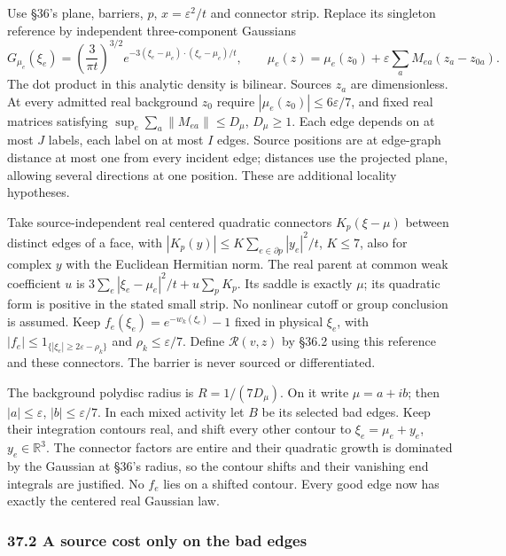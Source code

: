 \documentclass[11pt,a4paper]{article}
\begin{document}
Use §36's plane, barriers, \(p\), \(x=\varepsilon^2/t\) and connector
strip. Replace its singleton reference by independent three-component
Gaussians \[G_{\mu_e}(\xi_e)=\left(\frac3{\pi t}\right)^{3/2}
 e^{-3(\xi_e-\mu_e)\cdot(\xi_e-\mu_e)/t},\qquad
\mu_e(z)=\mu_e(z_0)+\varepsilon\sum_a M_{ea}(z_a-z_{0a}).
\tag{173}\] The dot product in this analytic density is bilinear.
Sources \(z_a\) are dimensionless. At every admitted real background
\(z_0\) require \(|\mu_e(z_0)|\le6\varepsilon/7\), and fixed real
matrices satisfying \(\sup_e\sum_a\|M_{ea}\|\le D_\mu\), \(D_\mu\ge1\).
Each edge depends on at most \(J\) labels, each label on at most \(I\)
edges. Source positions are at edge-graph distance at most one from
every incident edge; distances use the projected plane, allowing several
directions at one position. These are additional locality hypotheses.

Take source-independent real centered quadratic connectors
\(K_p(\xi-\mu)\) between distinct edges of a face, with
\(|K_p(y)|\le K\sum_{e\in\partial p}|y_e|^2/t\), \(K\le7\), also for
complex \(y\) with the Euclidean Hermitian norm. The real parent at
common weak coefficient \(u\) is
\(3\sum_e|\xi_e-\mu_e|^2/t+u\sum_pK_p\). Its saddle is exactly \(\mu\);
its quadratic form is positive in the stated small strip. No nonlinear
cutoff or group conclusion is assumed. Keep
\(f_e(\xi_e)=e^{-w_k(\xi_e)}-1\) fixed in physical \(\xi_e\), with
\(|f_e|\le1_{\{|\xi_e|\ge2\varepsilon-\rho_k\}}\) and
\(\rho_k\le\varepsilon/7\). Define \(\mathcal R(v,z)\) by §36.2 using
this reference and these connectors. The barrier is never sourced or
differentiated.

The background polydisc radius is \(R=1/(7D_\mu)\). On it write
\(\mu=a+ib\); then \(|a|\le\varepsilon\), \(|b|\le\varepsilon/7\). In
each mixed activity let \(B\) be its selected bad edges. Keep their
integration contours real, and shift every other contour to
\(\xi_e=\mu_e+y_e\), \(y_e\in\mathbb R^3\). The connector factors are
entire and their quadratic growth is dominated by the Gaussian at §36's
radius, so the contour shifts and their vanishing end integrals are
justified. No \(f_e\) lies on a shifted contour. Every good edge now has
exactly the centered real Gaussian law.

\hypertarget{a-source-cost-only-on-the-bad-edges}{%
\subsubsection{37.2 A source cost only on the bad
edges}\label{a-source-cost-only-on-the-bad-edges}}
\end{document}
